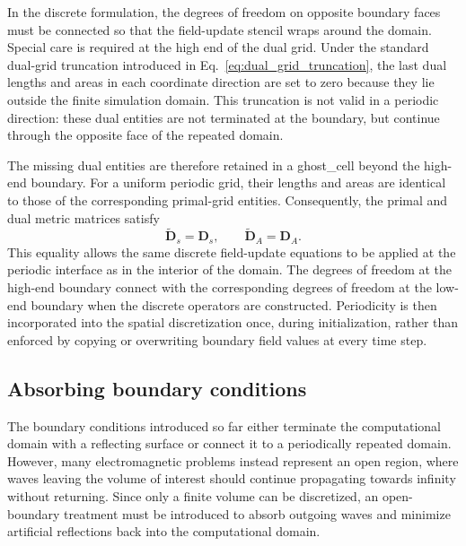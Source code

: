In the discrete formulation, the degrees of freedom on opposite boundary faces must be connected so that the field-update stencil wraps around the domain. Special care is required at the high end of the dual grid. Under the standard dual-grid truncation introduced in Eq.~\eqref{eq:dual_grid_truncation}, the last dual lengths and areas in each coordinate direction are set to zero because they lie outside the finite simulation domain. This truncation is not valid in a periodic direction: these dual entities are not terminated at the boundary, but continue through the opposite face of the repeated domain.

The missing dual entities are therefore retained in a \gls{ghost_cell} beyond the high-end boundary. For a uniform periodic grid, their lengths and areas are identical to those of the corresponding primal-grid entities. Consequently, the primal and dual metric matrices satisfy
%
\begin{equation}
\widetilde{\mathbf{D}}_{s}=\mathbf{D}_{s},
\qquad
\widetilde{\mathbf{D}}_{A}=\mathbf{D}_{A}.
\label{eq:periodic_metric_matrices}
\end{equation}
%
This equality allows the same discrete field-update equations to be applied at the periodic interface as in the interior of the domain. The degrees of freedom at the high-end boundary connect with the corresponding degrees of freedom at the low-end boundary when the discrete operators are constructed. Periodicity is then incorporated into the spatial discretization once, during initialization, rather than enforced by copying or overwriting boundary field values at every time step.

\subsection{Absorbing boundary conditions}
\label{sec:bc_absorbing}

The boundary conditions introduced so far either terminate the computational domain with a reflecting surface or connect it to a periodically repeated domain. However, many electromagnetic problems instead represent an open region, where waves leaving the volume of interest should continue propagating towards infinity without returning. Since only a finite volume can be discretized, an open-boundary treatment must be introduced to absorb outgoing waves and minimize artificial reflections back into the computational domain.

